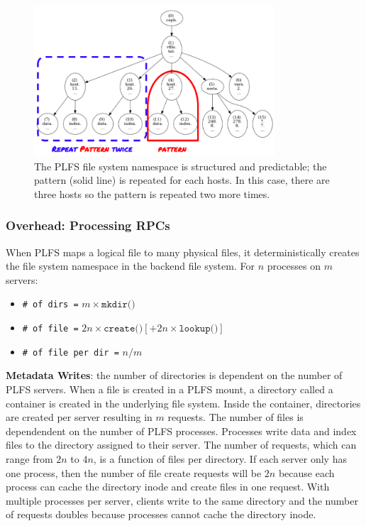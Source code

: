 \begin{figure}[tb]
\centering
  \includegraphics[width=90mm]{figures/tree_plfs.png} 
  \caption{The PLFS file system namespace is structured and predictable; the
  pattern (solid line) is repeated for each hosts. In this case, there are three
  hosts so the pattern is repeated two more times. 
  }\label{fig:tree_plfs}
\end{figure}

\subsubsection{Overhead: Processing RPCs}

When PLFS maps a logical file to many physical files, it deterministically
creates the file system namespace in the backend file system.  For \(n\)
processes on \(m\) servers:

\begin{itemize}
  \item[] \texttt{\# of dirs =} \(m \times \texttt{mkdir()}\)
  \item[] \texttt{\# of file =} \(2n \times \texttt{create()} [+ 2n \times \texttt{lookup()}]\)
  \item[] \texttt{\# of file per dir =} \(n/m\)
\end{itemize}


\textbf{Metadata Writes}: the number of directories is dependent on the number
of PLFS servers. When a file is created in a PLFS mount, a directory called a
container is created in the underlying file system. Inside the container,
directories are created per server resulting in \(m\) requests. The number of
files is dependendent on the number of PLFS processes. Processes write data and
index files to the directory assigned to their server. The number of requests,
which can range from \(2n\) to \(4n\), is a function of files per directory.
If each server only has one process, then the number of file create requests
will be \(2n\) because each process can cache the directory inode and create
files in one request. With multiple processes per server, clients write to the
same directory and the number of requests doubles because processes cannot
cache the directory inode.

